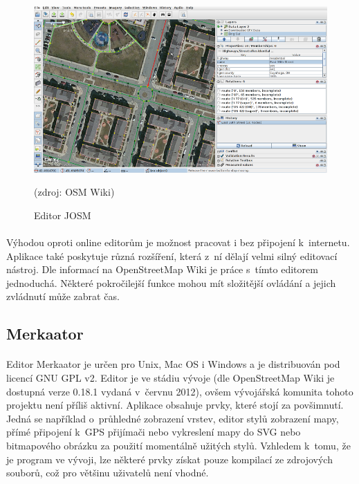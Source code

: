 \documentclass[11pt,a4paper,titlepage,oneside]{book}
\begin{document}
		\begin{figure}[!h]
			\begin{center}
				\includegraphics[width=12.6cm]{obrazky/josm_osm.png}
				\caption{Editor JOSM} (zdroj: OSM Wiki\cite{wiki_josm})
				\label{fig:josm_osm}
			\end{center}
		\end{figure}
			\paragraph{} Výhodou oproti online editorům je možnost pracovat i bez připojení k~internetu. Aplikace také poskytuje různá rozšíření, která z~ní dělají velmi silný editovací nástroj. Dle informací na OpenStreetMap Wiki\cite{wiki_josm} je práce s~tímto editorem jednoduchá. Některé pokročilejší funkce mohou mít složitější ovládání a jejich zvládnutí může zabrat čas.

		\subsection{Merkaator}
			\paragraph{} Editor Merkaator je určen pro Unix, Mac OS i Windows a je distribuován pod licencí GNU \ac{GPL} v2. Editor je ve stádiu vývoje (dle OpenStreetMap Wiki je dostupná verze 0.18.1 vydaná v~červnu 2012), ovšem vývojářská komunita tohoto projektu není příliš aktivní\cite{wiki_merkaator}. Aplikace obsahuje prvky, které stojí za povšimnutí. Jedná se například o~průhledné zobrazení vrstev, editor stylů zobrazení mapy, přímé připojení k~GPS přijímači nebo vykreslení mapy do \ac{SVG} nebo bitmapového obrázku za použití momentálně užitých stylů. Vzhledem k~tomu, že je program ve vývoji, lze některé prvky získat pouze kompilací ze zdrojových souborů, což pro většinu uživatelů není vhodné.
\end{document}
